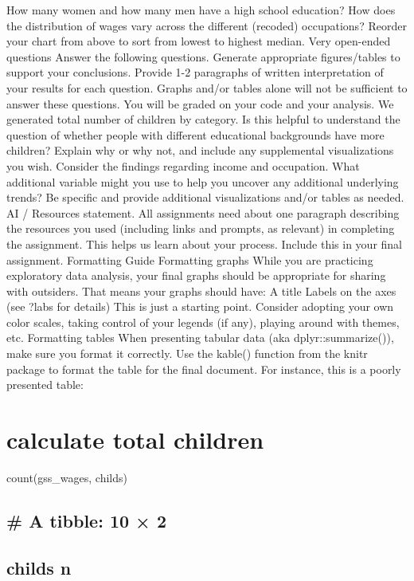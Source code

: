 \begin{userprompt}
How many women and how many men have a high school education?
How does the distribution of wages vary across the different (recoded) occupations? Reorder your chart from above to sort from lowest to highest median.
Very open-ended questions
Answer the following questions. Generate appropriate figures/tables to support your conclusions. Provide 1-2 paragraphs of written interpretation of your results for each question. Graphs and/or tables alone will not be sufficient to answer these questions. You will be graded on your code and your analysis.
We generated total number of children by category. Is this helpful to understand the question of whether people with different educational backgrounds have more children? Explain why or why not, and include any supplemental visualizations you wish.
Consider the findings regarding income and occupation. What additional variable might you use to help you uncover any additional underlying trends? Be specific and provide additional visualizations and/or tables as needed.
AI / Resources statement.
All assignments need about one paragraph describing the resources you used (including links and prompts, as relevant) in completing the assignment. This helps us learn about your process. Include this in your final assignment.
Formatting Guide
Formatting graphs
While you are practicing exploratory data analysis, your final graphs should be appropriate for sharing with outsiders. That means your graphs should have:
A title
Labels on the axes (see ?labs for details)
This is just a starting point. Consider adopting your own color scales, taking control of your legends (if any), playing around with themes, etc.
Formatting tables
When presenting tabular data (aka dplyr::summarize()), make sure you format it correctly. Use the kable() function from the knitr package to format the table for the final document. For instance, this is a poorly presented table:

\section{calculate total children}

count(gss\_wages, childs)

\subsection{\# A tibble: 10 × 2}

\subsection{childs n}


\end{userprompt}
